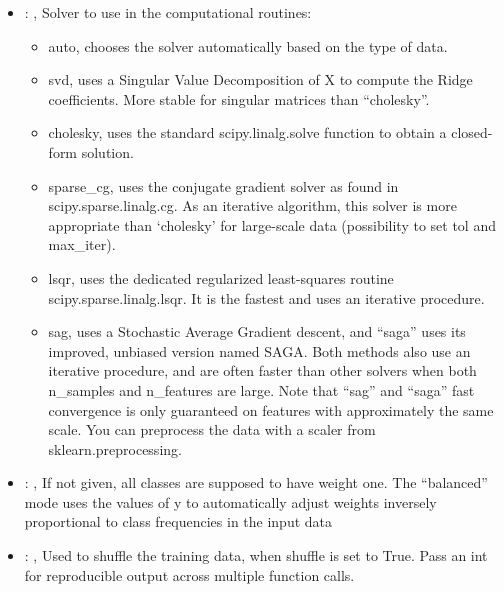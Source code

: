 \begin{itemize}
    \item {}: ,
      Solver to use in the computational routines:
      \begin{itemize}                                                    \item auto, chooses the
      solver automatically based on the type of data.
      \item svd, uses a Singular Value Decomposition of X to compute the Ridge coefficients. More
      stable for singular                                                                matrices
      than ``cholesky''.                                                    \item cholesky, uses the
      standard scipy.linalg.solve function to obtain a closed-form solution.
      \item sparse\_cg, uses the conjugate gradient solver as found in scipy.sparse.linalg.cg. As an
      iterative algorithm,                                                               this solver
      is more appropriate than ‘cholesky’ for large-scale data (possibility to set tol and
      max\_iter).                                                    \item lsqr, uses the dedicated
      regularized least-squares routine scipy.sparse.linalg.lsqr. It is the fastest and uses
      an iterative procedure.                                                    \item sag, uses a
      Stochastic Average Gradient descent, and ``saga'' uses its improved, unbiased version named
      SAGA.                                                               Both methods also use an
      iterative procedure, and are often faster than other solvers when both
      n\_samples and n\_features are large. Note that ``sag'' and ``saga'' fast convergence is only
      guaranteed on                                                               features with
      approximately the same scale. You can preprocess the data with a scaler from
      sklearn.preprocessing.                                                  \end{itemize}

    \item {}: \xmlDesc{[balanced]},
      If not given, all classes are supposed to have weight one.
      The “balanced” mode uses the values of y to automatically adjust weights
      inversely proportional to class frequencies in the input data

    \item {}: ,
      Used to shuffle the training data, when shuffle is set to
      True. Pass an int for reproducible output across multiple function calls.
  \end{itemize}


